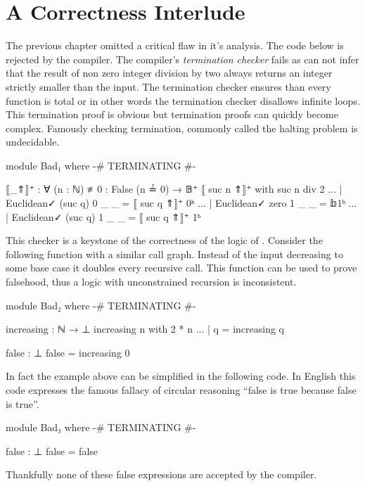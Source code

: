 \documentclass[./Thesis.tex]{subfiles}
\begin{document}
\section{A Correctness Interlude}
\label{sec:a-correctness-interlude}
The previous chapter omitted a critical flaw in it's analysis. The code below is
rejected by the \Agda{} compiler. The compiler's \textit{termination checker} \cite{agda}
fails as \Agda{} can not infer that the result of non zero integer division by
two always returns an integer strictly smaller than the input. The termination
checker ensures than every function is total or in other
words the termination checker disallows infinite loops. This termination proof
is obvious but termination proofs can quickly become complex. Famously checking
termination, commonly called the halting problem is undecidable. 
\begin{code}[hide]
  module Bad₁ where
    {-# TERMINATING #-}
\end{code}
\begin{code}
    ⟦_⇑⟧⁺ : ∀ (n : ℕ) {≢0 : False (n ≟ 0)} → 𝔹⁺
    ⟦ suc n ⇑⟧⁺ with suc n div 2
    ... | Euclidean✓ (suc q) 0 _ _ = ⟦ suc q ⇑⟧⁺ 0ᵇ
    ... | Euclidean✓ zero    1 _ _ = 𝕓1ᵇ
    ... | Euclidean✓ (suc q) 1 _ _ = ⟦ suc q ⇑⟧⁺ 1ᵇ
\end{code}
This checker is a keystone of the correctness of the logic of \Agda{}. Consider
the following function with a similar call graph. Instead of the input
decreasing to some base case it doubles every recursive call. This function can
be used to prove falsehood, thus a logic with unconstrained recursion is
inconsistent.
\begin{code}[hide]
  module Bad₂ where
    {-# TERMINATING #-}
\end{code}
\begin{code}
    increasing : ℕ → ⊥
    increasing n with 2 * n
    ... | q = increasing q

    false : ⊥
    false = increasing 0
\end{code}
In fact the example above can be simplified in the following code. In English
this code expresses the famous fallacy of circular reasoning ``false is true
because false is true''.
\begin{code}[hide]
  module Bad₃ where
    {-# TERMINATING #-}
\end{code}
\begin{code}
    false : ⊥
    false = false
\end{code}
Thankfully none of these false expressions are accepted by the \Agda{} compiler.
\end{document}
